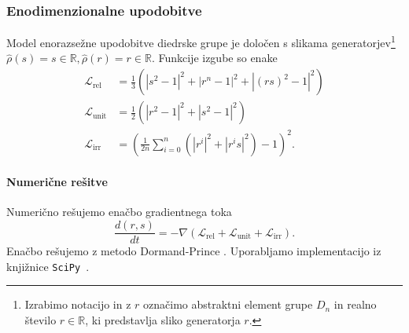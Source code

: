 \documentclass[mat2, tisk]{fmfdelo}
\newcommand{\TODO}[1]{{\color{blue} TODO: #1}}
\newcommand{\R}{\mathbb R}
\newcommand{\Loss}[1]{\mathcal L _\text{#1}}
\begin{document}
\subsubsection{Enodimenzionalne upodobitve}
Model enorazsežne upodobitve diedrske grupe
je določen s slikama generatorjev\footnote{Izrabimo notacijo
  in z $r$ označimo abstraktni element grupe $D_n$ in realno
število $r \in \R$, ki predstavlja sliko generatorja $r$.}
%
$\hat \rho(s) = s \in \R, \hat \rho(r)=r \in \R$. Funkcije izgube so enake
\begin{align*}
  \Loss{rel} &= \frac{1}{3} \left( |s^2 -1|^2 + |r^n -1|^2  +
  |(rs)^2 -1|^2  \right )\\
  \Loss{unit} &=  \frac{1}{2} \left ( |r^2 -1|^2 + |s ^2 -1|^2
  \right)  \\
  \Loss{irr} &= \left ( \frac{1}{2n}\sum_{i=0}^n(|r^i|^2 +
  |r^is|^2)    - 1\right )^2.
\end{align*}
\paragraph{Numerične rešitve}
Numerično rešujemo enačbo gradientnega toka
$$\frac{d(r,s)}{dt} = -\nabla(\Loss{rel} + \Loss{unit} +
\Loss{irr}).$$
Enačbo rešujemo z metodo Dormand-Prince
\cite{solvingordinarydifferentialequations1993nonstiff}. Uporabljamo
implementacijo iz knjižnice \texttt{SciPy}~\cite{2020SciPy-NMeth}.
\end{document}
